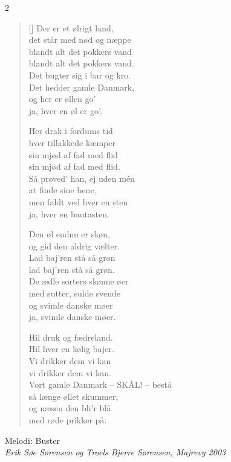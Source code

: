 \begin{multicols}2
\settowidth{\versewidth}{Vort gamle Danmark -- SKÅL!}
\begin{verse}[\versewidth]
Der er et ølrigt land,\\
det står med nød og næppe\\
blandt alt det pokkers vand\\
blandt alt det pokkers vand.\\
Det bugter sig i bar og kro.\\
Det hedder gamle Danmark,\\
og her er øllen go'\\
ja, hver en øl er go'.

Her drak i fordums tid\\
hver tillakkede kæmper\\
sin mjød af fad med flid\\
sin mjød af fad med flid.\\
Så prøved' han, ej uden mén\\
at finde sine bene,\\
men faldt ved hver en sten\\
ja, hver en bautasten.

Den øl endnu er skøn,\\
og gid den aldrig vælter.\\
Lad baj'ren stå så grøn\\
lad baj'ren stå så grøn.\\
De ædle sorters skønne øer\\
med sutter, sulde svende\\
og svimle danske møer\\
ja, svimle danske møer.

Hil druk og fædreland.\\
Hil hver en kølig bajer.\\
Vi drikker dem vi kan\\
vi drikker dem vi kan.\\
Vort gamle Danmark -- SKÅL! -- bestå\\
så længe øllet skummer,\\
og næsen den bli'r blå\\
med røde prikker på.
\end{verse}
\end{multicols}


{Melodi: Buster}\\[.2em]
{\small\itshape Erik Søe Sørensen og Troels Bjerre Sørensen, Majrevy 2003}

